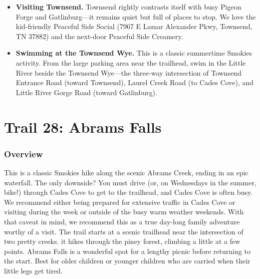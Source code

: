 \documentclass[
  letterpaper,
  DIV=11,
  numbers=noendperiod]{scrreprt}
\providecommand{\tightlist}{%
  \setlength{\itemsep}{0pt}\setlength{\parskip}{0pt}}\usepackage{longtable,booktabs,array}
\begin{document}
\begin{itemize}
\tightlist
\item
  \textbf{Visiting Townsend.} Townsend rightly contrasts itself with
  busy Pigeon Forge and Gatlinburg---it remains quiet but full of places
  to stop. We love the kid-friendly Peaceful Side Social (7967 E Lamar
  Alexander Pkwy, Townsend, TN 37882) and the next-door Peaceful Side
  Creamery.
\item
  \textbf{Swimming at the Townsend Wye.} This is a classic summertime
  Smokies activity. From the large parking area near the trailhead, swim
  in the Little River beside the Townsend Wye---the three-way
  intersection of Townsend Entrance Road (toward Townsend), Laurel Creek
  Road (to Cades Cove), and Little River Gorge Road (toward Gatlinburg).
\end{itemize}

\chapter{Trail 28: Abrams Falls}\label{trail-28-abrams-falls}

\subsection{Overview}\label{overview-28}

This is a classic Smokies hike along the scenic Abrams Creek, ending in
an epic waterfall. The only downside? You must drive (or, on Wednesdays
in the summer, bike!) through Cades Cove to get to the trailhead, and
Cades Cove is often busy. We recommend either being prepared for
extensive traffic in Cades Cove or visiting during the week or outside
of the busy warm weather weekends. With that caveat in mind, we
recommend this as a true day-long family adventure worthy of a visit.
The trail starts at a scenic trailhead near the intersection of two
pretty creeks. it hikes through the piney forest, climbing a little at a
few points. Abrams Falls is a wonderful spot for a lengthy picnic before
returning to the start. Best for older children or younger children who
are carried when their little legs get tired.
\end{document}
